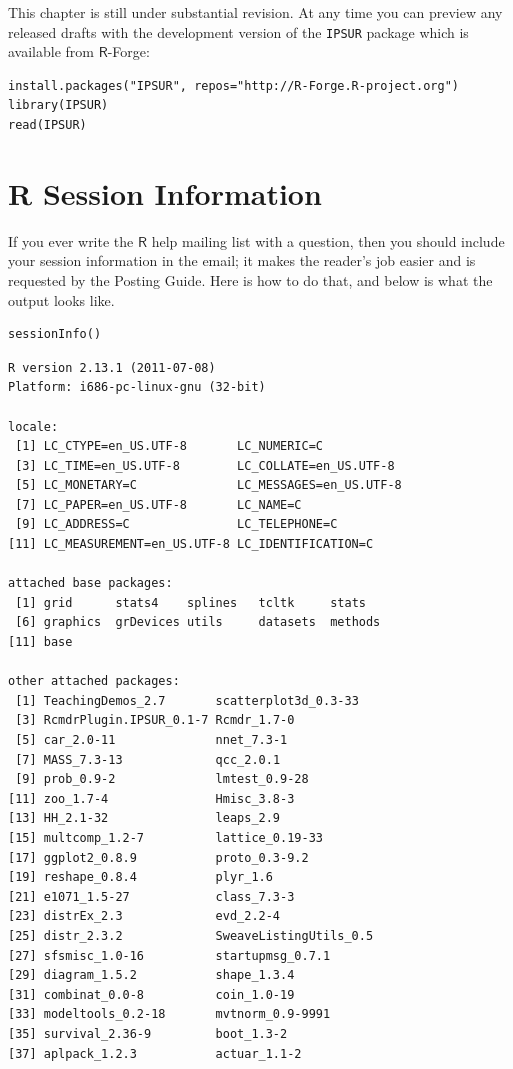 \documentclass[captions=tableheading]{scrbook}
\begin{document}
\begin{example}
This chapter is still under substantial revision. At any time you can preview any released drafts with the development version of the \texttt{IPSUR} package which is available from \(\mathsf{R}\)-Forge:


\lstset{language=R}
\begin{lstlisting}
install.packages("IPSUR", repos="http://R-Forge.R-project.org")
library(IPSUR)
read(IPSUR)
\end{lstlisting}


\appendix
\chapter{R Session Information}
\label{sec-17}
\label{cha-R-Session-Information}


If you ever write the \(\mathsf{R}\) help mailing list with a question, then you should include your session information in the email; it makes the reader's job easier and is requested by the Posting Guide. Here is how to do that, and below is what the output looks like.


\lstset{language=R}
\begin{lstlisting}
sessionInfo()
\end{lstlisting}


\begin{verbatim}
R version 2.13.1 (2011-07-08)
Platform: i686-pc-linux-gnu (32-bit)

locale:
 [1] LC_CTYPE=en_US.UTF-8       LC_NUMERIC=C              
 [3] LC_TIME=en_US.UTF-8        LC_COLLATE=en_US.UTF-8    
 [5] LC_MONETARY=C              LC_MESSAGES=en_US.UTF-8   
 [7] LC_PAPER=en_US.UTF-8       LC_NAME=C                 
 [9] LC_ADDRESS=C               LC_TELEPHONE=C            
[11] LC_MEASUREMENT=en_US.UTF-8 LC_IDENTIFICATION=C       

attached base packages:
 [1] grid      stats4    splines   tcltk     stats    
 [6] graphics  grDevices utils     datasets  methods  
[11] base     

other attached packages:
 [1] TeachingDemos_2.7       scatterplot3d_0.3-33   
 [3] RcmdrPlugin.IPSUR_0.1-7 Rcmdr_1.7-0            
 [5] car_2.0-11              nnet_7.3-1             
 [7] MASS_7.3-13             qcc_2.0.1              
 [9] prob_0.9-2              lmtest_0.9-28          
[11] zoo_1.7-4               Hmisc_3.8-3            
[13] HH_2.1-32               leaps_2.9              
[15] multcomp_1.2-7          lattice_0.19-33        
[17] ggplot2_0.8.9           proto_0.3-9.2          
[19] reshape_0.8.4           plyr_1.6               
[21] e1071_1.5-27            class_7.3-3            
[23] distrEx_2.3             evd_2.2-4              
[25] distr_2.3.2             SweaveListingUtils_0.5 
[27] sfsmisc_1.0-16          startupmsg_0.7.1       
[29] diagram_1.5.2           shape_1.3.4            
[31] combinat_0.0-8          coin_1.0-19            
[33] modeltools_0.2-18       mvtnorm_0.9-9991       
[35] survival_2.36-9         boot_1.3-2             
[37] aplpack_1.2.3           actuar_1.1-2           


\end{verbatim}
\end{example}
\end{document}

